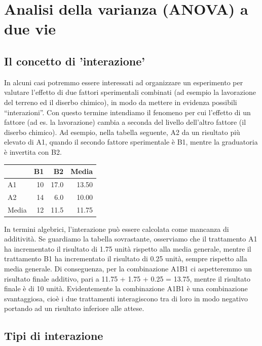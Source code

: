\documentclass[a4paper,12pt,oneside]{book}
\theoremstyle{definition}
\theoremstyle{definition}
\theoremstyle{definition}
\theoremstyle{remark}
\begin{document}
\chapter{Analisi della varianza (ANOVA) a due
vie}\label{analisi-della-varianza-anova-a-due-vie}

\section{Il concetto di 'interazione'}\label{il-concetto-di-interazione}

In alcuni casi potremmo essere interessati ad organizzare un esperimento
per valutare l'effetto di due fattori sperimentali combinati (ad esempio
la lavorazione del terreno ed il diserbo chimico), in modo da mettere in
evidenza possibili ``interazioni''. Con questo termine intendiamo il
fenomeno per cui l'effetto di un fattore (ad es. la lavorazione) cambia
a seconda del livello dell'altro fattore (il diserbo chimico). Ad
esempio, nella tabella seguente, A2 da un risultato più elevato di A1,
quando il secondo fattore sperimentale è B1, mentre la graduatoria è
invertita con B2.

\begin{tabular}{l|r|r|r}
\hline
  & B1 & B2 & Media\\
\hline
A1 & 10 & 17.0 & 13.50\\
\hline
A2 & 14 & 6.0 & 10.00\\
\hline
Media & 12 & 11.5 & 11.75\\
\hline
\end{tabular}

In termini algebrici, l'interazione può essere calcolata come mancanza
di additività. Se guardiamo la tabella sovrastante, osserviamo che il
trattamento A1 ha incrementato il risultato di 1.75 unità rispetto alla
media generale, mentre il trattamento B1 ha incrementato il risultato di
0.25 unità, sempre rispetto alla media generale. Di conseguenza, per la
combinazione A1B1 ci aspetteremmo un risultato finale additivo, pari a
11.75 + 1.75 + 0.25 = 13.75, mentre il risultato finale è di 10 unità.
Evidentemente la combinazione A1B1 è una combinazione svantaggiosa, cioè
i due trattamenti interagiscono tra di loro in modo negativo portando ad
un risultato inferiore alle attese.

\section{Tipi di interazione}\label{tipi-di-interazione}
\end{document}
